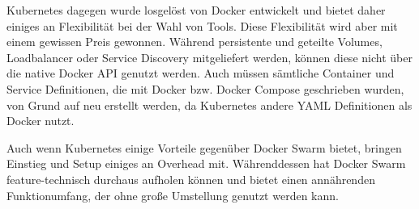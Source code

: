 Kubernetes dagegen wurde losgelöst von Docker entwickelt und bietet daher einiges an Flexibilität bei der Wahl von Tools.
Diese Flexibilität wird aber mit einem gewissen Preis gewonnen.
Während persistente und geteilte Volumes, Loadbalancer oder Service Discovery mitgeliefert werden, können diese nicht über die native Docker API genutzt werden.
Auch müssen sämtliche Container und Service Definitionen, die mit Docker bzw. Docker Compose geschrieben wurden, von Grund auf neu erstellt werden, da Kubernetes andere YAML Definitionen als Docker nutzt.

Auch wenn Kubernetes einige Vorteile gegenüber Docker Swarm bietet, bringen Einstieg und Setup einiges an Overhead mit.
Währenddessen hat Docker Swarm feature-technisch durchaus aufholen können und bietet einen annährenden Funktionumfang, der ohne große Umstellung genutzt werden kann.
